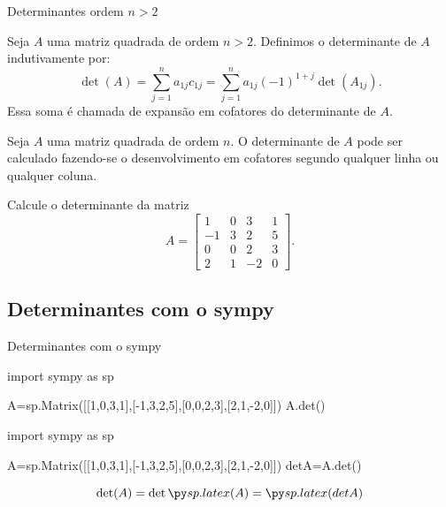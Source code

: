 \begin{frame}[label=determinantes]{Determinantes ordem $n>2$}
\begin{defin}
Seja $A$ uma matriz quadrada de ordem $n>2$. Definimos o {\color{blue}determinante} de $A$ indutivamente por:
\[\det(A)=\sum_{j=1}^{n}a_{1j}c_{1j}=\sum_{j=1}^{n}a_{1j}(-1)^{1+j}\det(A_{1j}).\]
Essa soma é chamada de {\color{blue}expansão em cofatores} do determinante de $A$.
\end{defin}


\end{frame}


\begin{frame}[label=determinantes]
\begin{teo}
Seja $A$ uma matriz quadrada de ordem $n$. O determinante de $A$ pode ser calculado fazendo-se o desenvolvimento em cofatores segundo {\color{blue}} qualquer linha ou qualquer coluna.
\end{teo}

\begin{exe}
Calcule o determinante da matriz 
\[
A=\begin{bmatrix}
 1 & 0 & 3 & 1 \\ -1 & 3 & 2 & 5 \\ 	0 & 0 & 2  & 3\\ 2 & 1 & -2 & 0
\end{bmatrix}.
\]
\end{exe}

\end{frame}


\subsection*{Determinantes com o sympy}

\begin{frame}[label=determinantes,fragile=singleslide]{Determinantes com o sympy}
	\begin{footnotesize}
\begin{pyverbatim}
import sympy as sp

A=sp.Matrix([[1,0,3,1],[-1,3,2,5],[0,0,2,3],[2,1,-2,0]])
A.det()
\end{pyverbatim}
	\end{footnotesize}		
\begin{pycode}
import sympy as sp

A=sp.Matrix([[1,0,3,1],[-1,3,2,5],[0,0,2,3],[2,1,-2,0]])
detA=A.det()
\end{pycode}
\[\det(A)=\det \pyl{A}=\pyl{detA}\]
\end{frame}


